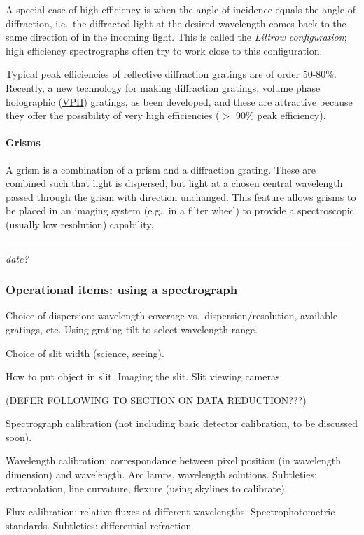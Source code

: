 \documentclass[12pt]{article}
\newcommand{\mydate}[1]{
    \begin{flushright}
        \rule{\textwidth}{0.4pt} %
        \footnotesize\hfill\textit{#1}
    \end{flushright}}
\begin{document}
A special case of high efficiency is when the angle of incidence equals the
angle of diffraction, i.e.\ the diffracted light at the desired wavelength
comes back to the same direction of in the incoming light. This is called the
\textit{Littrow configuration}; high efficiency spectrographs often try to work
close to this configuration.

Typical peak efficiencies of reflective diffraction gratings are of order
50-80\%. Recently, a new technology for making diffraction gratings, volume
phase holographic (\href{http://www.kosi.com/Holographic_Gratings/vph_ht_overview.php}
{VPH}) gratings, as been developed, and these are attractive because they offer
the possibility of very high efficiencies ($>$ 90\% peak efficiency).

\paragraph{Grisms}
A grism is a combination of a prism and a diffraction grating. These are
combined such that light is dispersed, but light at a chosen central wavelength
passed through the grism with direction unchanged. This feature allows grisms
to be placed in an imaging system (e.g., in a filter wheel) to provide a
spectroscopic (usually low resolution) capability.

\mydate{date?}
\subsubsection{Operational items: using a spectrograph}
Choice of dispersion: wavelength coverage vs.\ dispersion/resolution,
available gratings, etc. Using grating tilt to select wavelength
range.

Choice of slit width (science, seeing).

How to put object in slit. Imaging the slit. Slit viewing cameras.

(DEFER FOLLOWING TO SECTION ON DATA REDUCTION???)

Spectrograph calibration (not including basic detector calibration, to
be discussed soon).

Wavelength calibration: correspondance between pixel position (in
wavelength dimension) and wavelength. Arc lamps, wavelength solutions.
Subtleties: extrapolation, line curvature, flexure (using skylines to
calibrate).

Flux calibration: relative fluxes at different wavelengths.
Spectrophotometric standards. Subtleties: differential refraction
\end{document}
